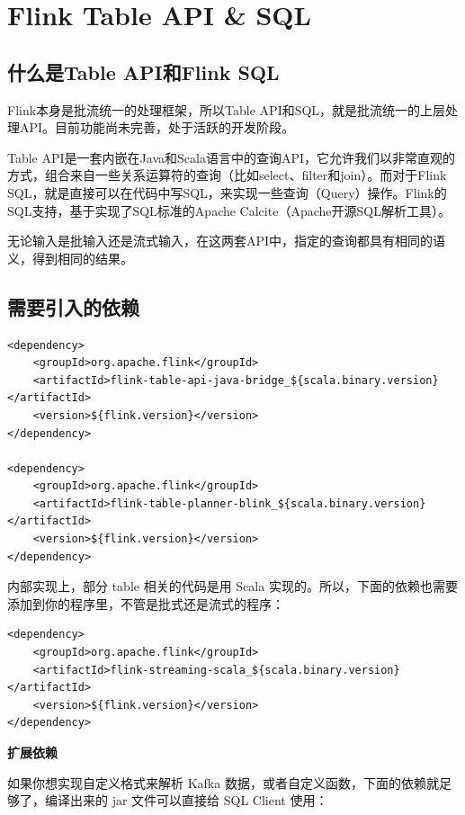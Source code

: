 \documentclass[cn,11pt,chinese]{elegantbook}
\begin{document}
\chapter{Flink Table API \& SQL}

\section{什么是Table API和Flink SQL}

Flink本身是批流统一的处理框架，所以Table API和SQL，就是批流统一的上层处理API。目前功能尚未完善，处于活跃的开发阶段。

Table API是一套内嵌在Java和Scala语言中的查询API，它允许我们以非常直观的方式，组合来自一些关系运算符的查询（比如select、filter和join）。而对于Flink SQL，就是直接可以在代码中写SQL，来实现一些查询（Query）操作。Flink的SQL支持，基于实现了SQL标准的Apache Calcite（Apache开源SQL解析工具）。

无论输入是批输入还是流式输入，在这两套API中，指定的查询都具有相同的语义，得到相同的结果。

\section{需要引入的依赖}

\begin{verbatim}
<dependency>
    <groupId>org.apache.flink</groupId>
    <artifactId>flink-table-api-java-bridge_${scala.binary.version}</artifactId>
    <version>${flink.version}</version>
</dependency>

<dependency>
    <groupId>org.apache.flink</groupId>
    <artifactId>flink-table-planner-blink_${scala.binary.version}</artifactId>
    <version>${flink.version}</version>
</dependency>
\end{verbatim}

内部实现上，部分 table 相关的代码是用 Scala 实现的。所以，下面的依赖也需要添加到你的程序里，不管是批式还是流式的程序：

\begin{verbatim}
<dependency>
    <groupId>org.apache.flink</groupId>
    <artifactId>flink-streaming-scala_${scala.binary.version}</artifactId>
    <version>${flink.version}</version>
</dependency>
\end{verbatim}

\textbf{扩展依赖}

如果你想实现自定义格式来解析 Kafka 数据，或者自定义函数，下面的依赖就足够了，编译出来的 jar 文件可以直接给 SQL Client 使用：
\end{document}
